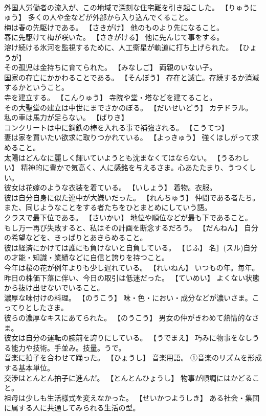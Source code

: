 \documentclass[8pt]{extreport}
\begin{document}
\begin{CJK}{UTF8}{min}
\\	外国人労働者の流入が、この地域で深刻な住宅難を引き起こした。	【りゅうにゅう】 多くの人や金などが外部から入り込んでくること。
\\	梅は春の先駆けである。	【さきがけ】 他のものより先になること。
\\	春に先駆けて梅が咲いた。	【さきがける】 他に先んじて事をする。
\\	溶け続ける氷河を監視するために、人工衛星が軌道に打ち上げられた。	【ひょうが】 
\\	その孤児は金持ちに育てられた。	【みなしご】 両親のいない子。
\\	国家の存亡にかかわることである。	【そんぼう】 存在と滅亡。存続するか消滅するかということ。
\\	寺を建立する。	【こんりゅう】 寺院や堂・塔などを建てること。
\\	その大聖堂の建立は中世にまでさかのぼる。	【だいせいどう】 カテドラル。
\\	私の車は馬力が足らない。	【ばりき】 
\\	コンクリートは中に鋼鉄の棒を入れる事で補強される。	【こうてつ】 
\\	妻は家を買いたい欲求に取りつかれている。	【よっきゅう】 強くほしがって求めること。
\\	太陽はどんなに麗しく輝いていようとも沈まなくてはならない。	【うるわしい】 精神的に豊かで気高く、人に感銘を与えるさま。心あたたまり、うつくしい。
\\	彼女は花嫁のような衣装を着ている。	【いしょう】 着物。衣服。
\\	彼は自分自身に似た連中が大嫌いだった。	【れんちゅう】 仲間である者たち。また、同じようなことをする者たちをひとまとめにしていう語。
\\	クラスで最下位である。	【さいかい】 地位や順位などが最も下であること。
\\	もし万一再び失敗すると、私はその計画を断念するだろう。	【だんねん】 自分の希望などを、きっぱりとあきらめること。
\\	彼は経済にかけては誰にも負けないと自負している。	【じふ】 名］(スル)自分の才能・知識・業績などに自信と誇りを持つこと。
\\	今年は桜の花が例年よりも少し遅れている。	【れいねん】 いつもの年。毎年。
\\	昨日の株価下落に伴い、今日の取引は低迷だった。	【ていめい】 よくない状態から抜け出せないでいること。
\\	濃厚な味付けの料理。	【のうこう】 味・色・におい・成分などが濃いさま。こってりとしたさま。
\\	彼らの濃厚なキスにあてられた。	【のうこう】 男女の仲がきわめて熱情的なさま。
\\	彼女は自分の運転の腕前を誇りにしている。	【うでまえ】 巧みに物事をなしうる能力や技術。手並み。技量。うで。
\\	音楽に拍子を合わせて踊った。	【ひょうし】 音楽用語。 ①音楽のリズムを形成する基本単位。
\\	交渉はとんとん拍子に進んだ。	【とんとんひょうし】 物事が順調にはかどること。
\\	祖母は少しも生活様式を変えなかった。	【せいかつようしき】 ある社会・集団に属する人に共通してみられる生活の型。
\end{CJK}
\end{document}
